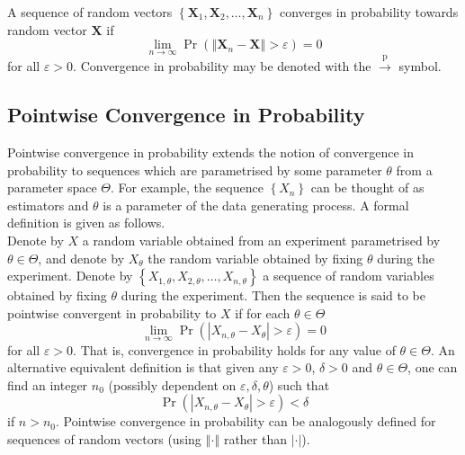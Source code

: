 \documentclass[11pt]{report} %
\begin{document}
A sequence of random vectors $\left\{\mathbf{X}_{1}, \mathbf{X}_{2}, \dots, \mathbf{X}_{n} \right\}$ converges in probability towards random vector $\mathbf{X}$ if
\begin{equation}
\lim_{n\to \infty}\operatorname{Pr}\left(\left\Vert \mathbf{X}_{n} - \mathbf{X}\right\Vert > \varepsilon\right) = 0
\end{equation} 
for all $\varepsilon > 0$. Convergence in probability may be denoted with the $\overset{\mathrm{p}}\to$ symbol.

\subsection{Pointwise Convergence in Probability}

Pointwise convergence in probability extends the notion of convergence in probability to sequences which are parametrised by some parameter $\theta$ from a parameter space $\Theta$. For example, the sequence $\left\{X_{n}\right\}$ can be thought of as estimators and $\theta$ is a parameter of the data generating process. A formal definition is given as follows. \\
 
Denote by $X$ a random variable obtained from an experiment parametrised by $\theta\in\Theta$, and denote by $X_{\theta}$ the random variable obtained by fixing $\theta$ during the experiment. Denote by $\left\{X_{1, \theta}, X_{2, \theta}, \dots, X_{n, \theta}\right\}$ a sequence of random variables obtained by fixing $\theta$ during the experiment. Then the sequence is said to be pointwise convergent in probability to $X$ if for each $\theta\in\Theta$
\begin{equation}
\lim_{n\to \infty}\operatorname{Pr}\left(\left|X_{n, \theta} - X_{\theta}\right| > \varepsilon\right) = 0
\end{equation}
for all $\varepsilon > 0$. That is, convergence in probability holds for any value of $\theta\in\Theta$. An alternative equivalent definition is that given any $\varepsilon > 0$, $\delta > 0$ and $\theta\in\Theta$, one can find an integer $n_{0}$ (possibly dependent on $\varepsilon, \delta, \theta$) such that
\begin{equation}
\operatorname{Pr}\left(\left|X_{n, \theta} - X_{\theta}\right| > \varepsilon\right) < \delta
\end{equation}
if $n > n_{0}$. Pointwise convergence in probability can be analogously defined for sequences of random vectors (using $\left\Vert\cdot\right\Vert$ rather than $\left|\cdot\right|$).
\end{document}
